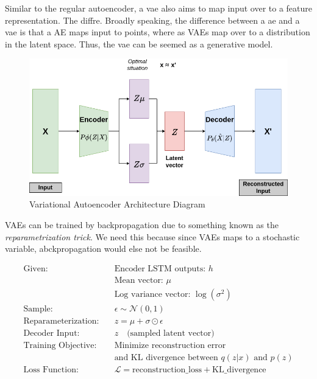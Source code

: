 Similar to the regular autoencoder, a \acrfull{vae} also aims to map input over to a feature representation. The diffre. Broadly speaking, the difference between a \acrshort{ae} and a \acrshort{vae} is that a AE maps input to points, where as VAEs map over to a distribution in the latent space. Thus, the \acrlong{vae} can be seemed as a generative model.


\begin{figure}[h]
    \centering
    \includegraphics[scale=0.5]{figures/vae.png}
    \caption{Variational Autoencoder Architecture Diagram}
    \label{fig:vaediagram}
\end{figure}


VAEs can be trained by backpropagation due to something known as the \textit{reparametrization trick}. We need this because since VAEs maps to a stochastic variable, abckpropagation would else not be feasible.

\begin{align*}
\text{Given:} & \quad \text{Encoder LSTM outputs: } h \\
& \quad \text{Mean vector: } \mu \\
& \quad \text{Log variance vector: } \log(\sigma^2) \\
\text{Sample:} & \quad \epsilon \sim \mathcal{N}(0, 1) \\
\text{Reparameterization:} & \quad z = \mu + \sigma \odot \epsilon \\
\text{Decoder Input:} & \quad z \quad \text{(sampled latent vector)} \\
\text{Training Objective:} & \quad \text{Minimize reconstruction error} \\
& \quad \text{and KL divergence between } q(z|x) \text{ and } p(z) \\
\text{Loss Function:} & \quad \mathcal{L} = \text{reconstruction\_loss} + \text{KL\_divergence}
\end{align*}




